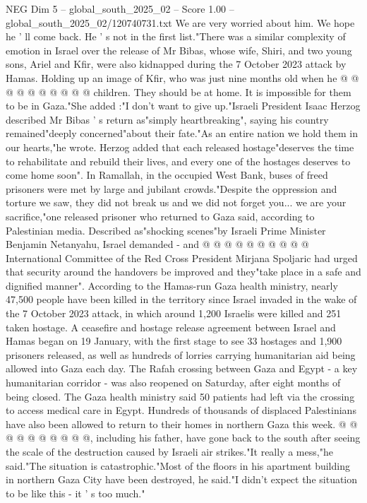 \begin{textsample}{NEG Dim 5 – global\_south\_2025\_02 – Score 1.00 – global\_south\_2025\_02/120740731.txt}
We are very worried about him.
We hope he ' ll come back.
He ' s not in the first list."There was a similar complexity of emotion in Israel over the release of Mr Bibas, whose wife, Shiri, and two young sons, Ariel and Kfir, were also kidnapped during the 7 October 2023 attack by Hamas.
Holding up an image of Kfir, who was just nine months old when he @ @ @ @ @ @ @ @ @ @ children.
They should be at home.
It is impossible for them to be in Gaza."She added :"I don't want to give up."Israeli President Isaac Herzog described Mr Bibas ' s return as"simply heartbreaking", saying his country remained"deeply concerned"about their fate."As an entire nation we hold them in our hearts,"he wrote.
Herzog added that each released hostage"deserves the time to rehabilitate and rebuild their lives, and every one of the hostages deserves to come home soon".
In Ramallah, in the occupied West Bank, buses of freed prisoners were met by large and jubilant crowds."Despite the oppression and torture we saw, they did not break us and we did not forget you... we are your sacrifice,"one released prisoner who returned to Gaza said, according to Palestinian media.
Described as"shocking scenes"by Israeli Prime Minister Benjamin Netanyahu, Israel demanded - and @ @ @ @ @ @ @ @ @ @ International Committee of the Red Cross President Mirjana Spoljaric had urged that security around the handovers be improved and they"take place in a safe and dignified manner".
According to the Hamas-run Gaza health ministry, nearly 47,500 people have been killed in the territory since Israel invaded in the wake of the 7 October 2023 attack, in which around 1,200 Israelis were killed and 251 taken hostage.
A ceasefire and hostage release agreement between Israel and Hamas began on 19 January, with the first stage to see 33 hostages and 1,900 prisoners released, as well as hundreds of lorries carrying humanitarian aid being allowed into Gaza each day.
The Rafah crossing between Gaza and Egypt - a key humanitarian corridor - was also reopened on Saturday, after eight months of being closed.
The Gaza health ministry said 50 patients had left via the crossing to access medical care in Egypt.
Hundreds of thousands of displaced Palestinians have also been allowed to return to their homes in northern Gaza this week. @ @ @ @ @ @ @ @ @ @, including his father, have gone back to the south after seeing the scale of the destruction caused by Israeli air strikes."It really a mess,"he said."The situation is catastrophic."Most of the floors in his apartment building in northern Gaza City have been destroyed, he said."I didn't expect the situation to be like this - it ' s too much."

\end{textsample}
